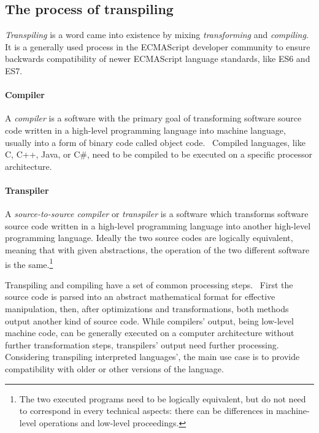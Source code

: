 \subsection{The process of transpiling}

\emph{Transpiling} is a word came into existence by mixing \emph{transforming} and \emph{compiling}. It is a generally used process in the ECMAScript developer community to ensure backwards compatibility of newer ECMAScript language standards, like ES6 and ES7.

\paragraph{Compiler}

A \emph{compiler} is a software with the primary goal of transforming software source code written in a high-level programming language into machine language, usually into a form of binary code called object code.~\cite{pcmagcompilers} Compiled languages, like C, C++, Java, or C\#, need to be compiled to be executed on a specific processor architecture.

\paragraph{Transpiler}

A \emph{source-to-source compiler} or \emph{transpiler} is a software which transforms software source code written in a high-level programming language into another high-level programming language. Ideally the two source codes are logically equivalent, meaning that with given abstractions, the operation of the two different software is the same.\footnote{The two executed programs need to be logically equivalent, but do not need to correspond in every technical aspects: there can be differences in machine-level operations and low-level proceedings.}

Transpiling and compiling have a set of common processing steps.~\cite{kulkarnitranspiler} First the source code is parsed into an abstract mathematical format for effective manipulation, then, after optimizations and transformations, both methods output another kind of source code. While compilers' output, being low-level machine code, can be generally executed on a computer architecture without further transformation steps, transpilers' output need further processing. Considering transpiling interpreted languages', the main use case is to provide compatibility with older or other versions of the language.

